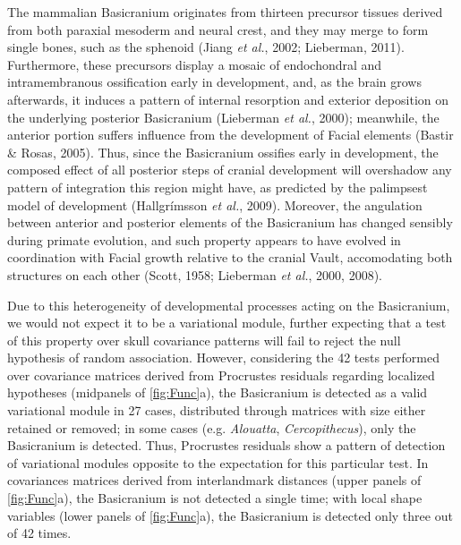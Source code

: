 \documentclass[12pt,twoside]{report}
\begin{document}
The mammalian Basicranium originates from thirteen precursor tissues
derived from both paraxial mesoderm and neural crest, and they may merge
to form single bones, such as the sphenoid (Jiang \emph{et al.}, 2002;
Lieberman, 2011). Furthermore, these precursors display a mosaic of
endochondral and intramembranous ossification early in development, and,
as the brain grows afterwards, it induces a pattern of internal
resorption and exterior deposition on the underlying posterior
Basicranium (Lieberman \emph{et al.}, 2000); meanwhile, the anterior
portion suffers influence from the development of Facial elements
(Bastir \& Rosas, 2005). Thus, since the Basicranium ossifies early in
development, the composed effect of all posterior steps of cranial
development will overshadow any pattern of integration this region might
have, as predicted by the palimpsest model of development (Hallgrímsson
\emph{et al.}, 2009). Moreover, the angulation between anterior and
posterior elements of the Basicranium has changed sensibly during
primate evolution, and such property appears to have evolved in
coordination with Facial growth relative to the cranial Vault,
accomodating both structures on each other (Scott, 1958; Lieberman
\emph{et al.}, 2000, 2008).

Due to this heterogeneity of developmental processes acting on the
Basicranium, we would not expect it to be a variational module, further
expecting that a test of this property over skull covariance patterns
will fail to reject the null hypothesis of random association. However,
considering the 42 tests performed over covariance matrices derived from
Procrustes residuals regarding localized hypotheses (midpanels of
\autoref{fig:Func}a), the Basicranium is detected as a valid variational
module in 27 cases, distributed through matrices with size either
retained or removed; in some cases (e.g. \emph{Alouatta},
\emph{Cercopithecus}), only the Basicranium is detected. Thus,
Procrustes residuals show a pattern of detection of variational modules
opposite to the expectation for this particular test. In covariances
matrices derived from interlandmark distances (upper panels of
\autoref{fig:Func}a), the Basicranium is not detected a single time;
with local shape variables (lower panels of \autoref{fig:Func}a), the
Basicranium is detected only three out of 42 times.
\end{document}
